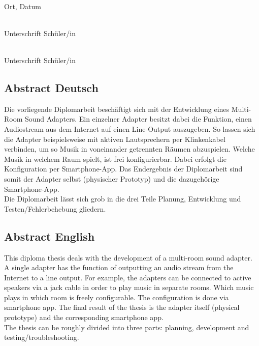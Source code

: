 \documentclass[11pt, twoside]{article}
\begin{document}
\vspace{30mm}

\noindent
\begin{minipage}[c]{5cm}
	\centering \dotfill \\
	Ort, Datum
\end{minipage}
\hfill
    \begin{minipage}[c]{5cm}
        \centering \dotfill \\
        Unterschrift Schüler/in
    \end{minipage}
    
\vspace{10mm}

\noindent
\begin{flushright}
    \begin{minipage}[c]{5cm}
        \centering \dotfill \\
        Unterschrift Schüler/in
    \end{minipage}
\end{flushright}

\pagebreak

\subsection{Abstract Deutsch}
Die vorliegende Diplomarbeit beschäftigt sich mit der Entwicklung eines Multi-Room Sound Adapters. Ein einzelner Adapter besitzt dabei die Funktion, einen Audiostream aus dem Internet auf einen Line-Output auszugeben. So lassen sich die Adapter beispielsweise mit aktiven Lautsprechern per Klinkenkabel verbinden, um so Musik in voneinander getrennten Räumen abzuspielen. Welche Musik in welchem Raum spielt, ist frei konfigurierbar. Dabei erfolgt die Konfiguration per Smartphone-App. Das Endergebnis der Diplomarbeit sind somit der Adapter selbst (physischer Prototyp) und die dazugehörige Smartphone-App. \newline \\
Die Diplomarbeit lässt sich grob in die drei Teile Planung, Entwicklung und Testen/Fehlerbehebung gliedern.
\subsection{Abstract English}
This diploma thesis deals with the development of a multi-room sound adapter. A single adapter has the function of outputting an audio stream from the Internet to a line output. For example, the adapters can be connected to active speakers via a jack cable in order to play music in separate rooms. Which music plays in which room is freely configurable. The configuration is done via smartphone app. The final result of the thesis is the adapter itself (physical prototype) and the corresponding smartphone app. \newline \\
The thesis can be roughly divided into three parts: planning, development and testing/troubleshooting.
\end{document}
